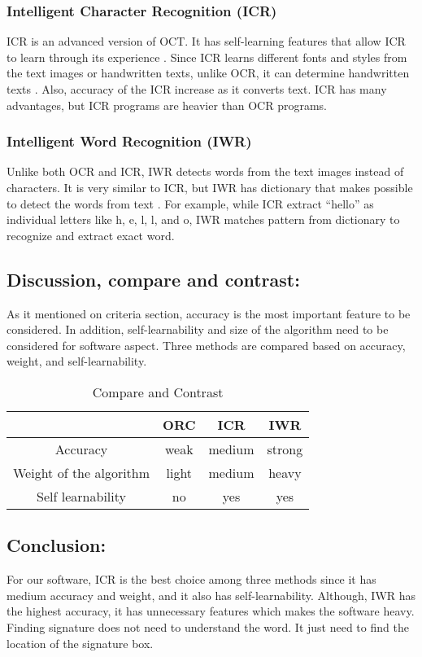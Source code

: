 \documentclass[onecolumn, draftclsnofoot,10pt, compsoc]{IEEEtran}
\begin{document}
\subsubsection{Intelligent Character Recognition (ICR)}
ICR is an advanced version of OCT. It has self-learning features that allow ICR to learn through its experience \cite{IC}. Since ICR learns different fonts and styles from the text images or handwritten texts, unlike OCR, it can determine handwritten texts \cite{IC}.  Also, accuracy of the ICR increase as it converts text. ICR has many advantages, but ICR programs are heavier than OCR programs.

\subsubsection{Intelligent Word Recognition (IWR)}
Unlike both OCR and ICR, IWR detects words from the text images instead of characters. It is very similar to ICR, but IWR has dictionary that makes possible to detect the words from text \cite{IW}. For example, while ICR extract \enquote{hello} as individual letters like h, e, l, l, and o, IWR matches pattern from dictionary to recognize and extract exact word. 

\subsection{Discussion, compare and contrast:}
As it mentioned on criteria section, accuracy is the most important feature to be considered. In addition, self-learnability and size of the algorithm need to be considered for software aspect. Three methods are compared based on accuracy, weight, and self-learnability.

\begin{table}[h]
\centering
\begin{tabular}{ | c | c | c | c |}
\hline
 & ORC & ICR & IWR\\ 
\hline
Accuracy & weak & medium & strong \\ 
\hline
Weight of the algorithm & light & medium & heavy\\ 
\hline
Self learnability & no & yes & yes\\ 
\hline
\end{tabular}
\caption{Compare and Contrast}
\label{table:1}
\end{table}

\subsection{Conclusion:}
For our software, ICR is the best choice among three methods since it has medium accuracy and weight, and it also has self-learnability. Although, IWR has the highest accuracy, it has unnecessary features which makes the software heavy. Finding signature does not need to understand the word. It just need to find the location of the signature box. 
\end{document}
